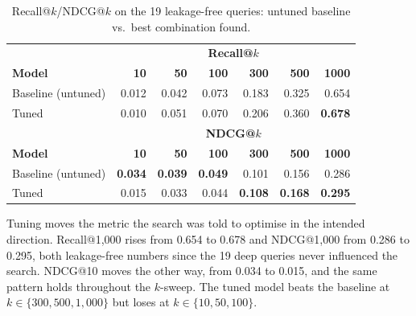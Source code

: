 \documentclass[a4paper,oneside,bibliography=totoc]{scrbook}
\begin{document}
\begin{table}[ht]
\centering
\caption{Recall@$k$/NDCG@$k$ on the 19 leakage-free queries: untuned baseline vs.\ best combination found.}
\label{tab:hyperparameter_tuning}
\begin{tabular}{lrrrrrr}
\toprule
& \multicolumn{6}{c}{\textbf{Recall@$k$}} \\
\textbf{Model} & \textbf{10} & \textbf{50} & \textbf{100} & \textbf{300} & \textbf{500} & \textbf{1000} \\
\midrule
Baseline (untuned) & 0.012 & 0.042 & 0.073 & 0.183 & 0.325 & 0.654 \\
Tuned               & 0.010 & 0.051 & 0.070 & 0.206 & 0.360 & \textbf{0.678} \\
\midrule
& \multicolumn{6}{c}{\textbf{NDCG@$k$}} \\
\textbf{Model} & \textbf{10} & \textbf{50} & \textbf{100} & \textbf{300} & \textbf{500} & \textbf{1000} \\
\midrule
Baseline (untuned) & \textbf{0.034} & \textbf{0.039} & \textbf{0.049} & 0.101 & 0.156 & 0.286 \\
Tuned               & 0.015 & 0.033 & 0.044 & \textbf{0.108} & \textbf{0.168} & \textbf{0.295} \\
\bottomrule
\end{tabular}
\end{table}

Tuning moves the metric the search was told to optimise in the intended direction. Recall@1{,}000 rises from 0.654 to 0.678 and NDCG@1{,}000 from 0.286 to 0.295, both leakage-free numbers since the 19 deep queries never influenced the search. NDCG@10 moves the other way, from 0.034 to 0.015, and the same pattern holds throughout the $k$-sweep. The tuned model beats the baseline at $k \in \{300, 500, 1{,}000\}$ but loses at $k \in \{10, 50, 100\}$.
\end{document}
